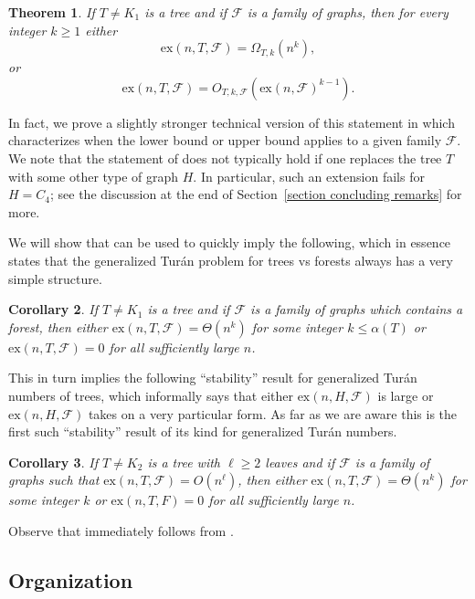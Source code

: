 \documentclass[12pt,letterpaper]{article}
\newtheorem{theorem}{Theorem}[section]
\newtheorem{corollary}[theorem]{Corollary}
\theoremstyle{definition}
\newcommand{\ex}{\mathrm{ex}}
\renewcommand{\c}[1]{\mathcal{#1}}
\newcommand{\Om}{\Omega}
\newcommand{\al}{\alpha}
\begin{document}
	\begin{theorem}\label{theorem weak tree reduction}
		If $T\ne K_1$ is a tree and if $\c{F}$ is a family of graphs, then for every integer $k\ge 1$ either
		\[
		\ex(n,T,\c{F})=\Om_{T,k}(n^k),
		\]
		or
		\[
		\ex(n,T,\c{F})=O_{T,k,\c{F}}(\ex(n,\c{F})^{k-1}).
		\]
	\end{theorem}
	In fact, we prove a slightly stronger technical version of this statement in  which characterizes when the lower bound or upper bound applies to a given family $\c{F}$.  We note that the statement of  does not typically hold if one replaces the tree $T$ with some other type of graph $H$. In particular, such an extension fails for $H=C_4$; see the discussion at the end of Section~\ref{section concluding remarks} for more.
	
	We will show that  can be used to quickly imply the following, which in essence states that the generalized Tur\'an problem for trees vs forests always has a very simple structure.
	\begin{corollary}\label{corollary trees vs forests}
		If $T\ne K_1$ is a tree and if $\c{F}$ is a family of graphs which contains a forest, then either $\ex(n,T,\c{F})=\Theta(n^k)$ for some integer $k\le \al(T)$ or $\ex(n,T,\c{F})=0$ for all sufficiently large $n$.
	\end{corollary}
	
	
	This in turn implies the following ``stability'' result for generalized Tur\'an numbers of trees, which informally says that either $\ex(n,H,\c{F})$ is large or $\ex(n,H,\c{F})$ takes on a very particular form.  As far as we are aware this is the first such ``stability'' result of its kind for generalized Tur\'an numbers.
	
	\begin{corollary}\label{theorem:leafGap}
		If $T\ne K_2$ is a tree with $\ell\ge 2$ leaves and if $\c{F}$ is a family of graphs such that $\ex(n,T,\c{F})=O(n^\ell)$, then either $\ex(n,T,\c{F})=\Theta(n^k)$ for some integer $k$ or $\ex(n,T,F)=0$ for all sufficiently large $n$.
	\end{corollary}
	
	Observe that  immediately follows from .
	
	\subsection{Organization}
	
\end{document}
